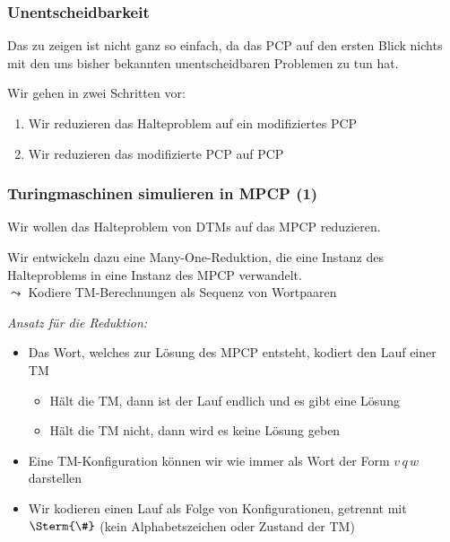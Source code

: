 \documentclass[aspectratio=1610,onlymath]{beamer}
\begin{document}
\begin{frame}\frametitle{Unentscheidbarkeit}

\pause

Das zu zeigen ist nicht ganz so einfach, da das PCP auf den ersten Blick
nichts mit den uns bisher bekannten unentscheidbaren Problemen zu tun hat.
\bigskip

Wir gehen in zwei Schritten vor:
\begin{enumerate}[(1)]
\item Wir reduzieren das Halteproblem auf ein \alert{modifiziertes PCP}
\item Wir reduzieren das modifizierte PCP auf PCP
\end{enumerate}\bigskip\pause


\end{frame}

\begin{frame}\frametitle{Turingmaschinen simulieren in MPCP (1)}

Wir wollen das Halteproblem von DTMs auf das MPCP reduzieren.\medskip

Wir entwickeln dazu eine \alert{Many-One-Reduktion}, die eine Instanz des Halteproblems
in eine Instanz des MPCP verwandelt.\\
$\leadsto$ Kodiere TM-Berechnungen als Sequenz von Wortpaaren
\bigskip\pause

\emph{Ansatz für die Reduktion:}
\begin{itemize}
\item Das Wort, welches zur Lösung des MPCP entsteht, kodiert den Lauf einer TM
\begin{itemize}
\item Hält die TM, dann ist der Lauf endlich und es gibt eine Lösung
\item Hält die TM nicht, dann wird es keine Lösung geben
\end{itemize}
\item Eine TM-Konfiguration können wir wie immer als Wort der Form $v\, q\, w$ darstellen
\item Wir kodieren einen Lauf als Folge von Konfigurationen, getrennt mit $\Sterm{\#}$ (kein Alphabetszeichen oder Zustand der TM)
\end{itemize}

\end{frame}
\end{document}
